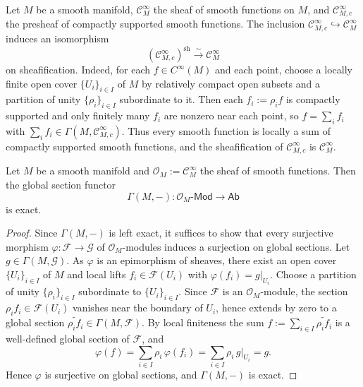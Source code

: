 \documentclass[11pt]{article}
\newcommand{\sh}{\operatorname{sh}}
\begin{document}
\begin{example}
  Let $ M $ be a smooth manifold, $ \mathscr{C}^{\infty}_{M} $ the sheaf of smooth functions on $ M $, 
  and $ \mathscr{C}^{\infty}_{M,c} $ the presheaf of compactly supported smooth functions. 
  The inclusion $ \mathscr{C}^{\infty}_{M,c} \hookrightarrow \mathscr{C}^{\infty}_{M} $ induces an isomorphism 
  $$ (\mathscr{C}^{\infty}_{M,c})^{\sh} \xrightarrow{\sim} \mathscr{C}^{\infty}_{M} $$
  on sheafification. Indeed, for each $ f \in C^{\infty}(M) $ and each point, choose a locally finite open cover 
  $ \{U_{i}\}_{i \in I} $ of $ M $ by relatively compact open subsets and a partition of unity 
  $ \{\rho_{i}\}_{i \in I} $ subordinate to it. Then each $ f_{i} := \rho_{i} f $ is compactly supported 
  and only finitely many $ f_{i} $ are nonzero near each point, so $ f = \sum_{i} f_{i} $ 
  with $ \sum_{i} f_{i} \in \Gamma(M,\mathscr{C}^{\infty}_{M,c}) $. 
  Thus every smooth function is locally a sum of compactly supported smooth functions, 
  and the sheafification of $ \mathscr{C}^{\infty}_{M,c} $ is $ \mathscr{C}^{\infty}_{M} $.
\end{example}

\begin{proposition}
  Let $ M $ be a smooth manifold and $ \mathscr{O}_{M} := \mathscr{C}^{\infty}_{M} $ the sheaf of smooth functions. 
  Then the global section functor 
  $$ \Gamma(M,-) : \mathscr{O}_{M}\text{-}\mathsf{Mod} \longrightarrow \mathsf{Ab} $$
  is exact.
\end{proposition}

\begin{proof}
  Since $ \Gamma(M,-) $ is left exact, it suffices to show that every surjective morphism 
  $ \varphi : \mathscr{F} \to \mathscr{G} $ of $ \mathscr{O}_{M} $-modules induces a surjection on global sections. 
  Let $ g \in \Gamma(M,\mathscr{G}) $. As $ \varphi $ is an epimorphism of sheaves, there exist an open cover 
  $ \{U_{i}\}_{i \in I} $ of $ M $ and local lifts $ f_{i} \in \mathscr{F}(U_{i}) $ with 
  $ \varphi(f_{i}) = g|_{U_{i}} $. Choose a partition of unity $ \{\rho_{i}\}_{i \in I} $ subordinate to 
  $ \{U_{i}\}_{i \in I} $. Since $ \mathscr{F} $ is an $ \mathscr{O}_{M} $-module, the section 
  $ \rho_{i} f_{i} \in \mathscr{F}(U_{i}) $ vanishes near the boundary of $ U_{i} $, hence extends by zero 
  to a global section $ \widetilde{\rho_{i} f_{i}} \in \Gamma(M,\mathscr{F}) $. 
  By local finiteness the sum $ f := \sum_{i \in I} \widetilde{\rho_{i} f_{i}} $ is a well-defined global section of $ \mathscr{F} $, and
  $$ \varphi(f) = \sum_{i \in I} \rho_{i}\,\varphi(f_{i}) = \sum_{i \in I} \rho_{i}\, g|_{U_{i}} = g . $$
  Hence $ \varphi $ is surjective on global sections, and $ \Gamma(M,-) $ is exact.
\end{proof}
\end{document}

